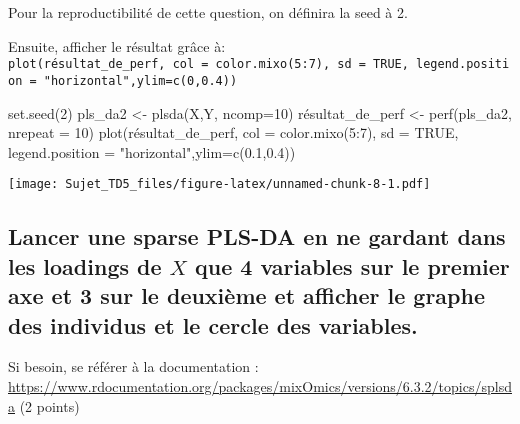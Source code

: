 \documentclass[
]{article}
\newenvironment{Shaded}{\begin{snugshade}}{\end{snugshade}}
\newcommand{\AttributeTok}[1]{\textcolor[rgb]{0.77,0.63,0.00}{#1}}
\newcommand{\ConstantTok}[1]{\textcolor[rgb]{0.00,0.00,0.00}{#1}}
\newcommand{\DecValTok}[1]{\textcolor[rgb]{0.00,0.00,0.81}{#1}}
\newcommand{\FloatTok}[1]{\textcolor[rgb]{0.00,0.00,0.81}{#1}}
\newcommand{\FunctionTok}[1]{\textcolor[rgb]{0.00,0.00,0.00}{#1}}
\newcommand{\NormalTok}[1]{#1}
\newcommand{\OtherTok}[1]{\textcolor[rgb]{0.56,0.35,0.01}{#1}}
\newcommand{\SpecialCharTok}[1]{\textcolor[rgb]{0.00,0.00,0.00}{#1}}
\newcommand{\StringTok}[1]{\textcolor[rgb]{0.31,0.60,0.02}{#1}}
\begin{document}
Pour la reproductibilité de cette question, on définira la seed à 2.

Ensuite, afficher le résultat grâce à:
\texttt{plot(résultat\_de\_perf,\ col\ =\ color.mixo(5:7),\ sd\ =\ TRUE,\ legend.position\ =\ "horizontal",ylim=c(0,0.4))}

\begin{Shaded}
\begin{Highlighting}[]
\FunctionTok{set.seed}\NormalTok{(}\DecValTok{2}\NormalTok{) }
\NormalTok{pls\_da2 }\OtherTok{\textless{}{-}} \FunctionTok{plsda}\NormalTok{(X,Y, }\AttributeTok{ncomp=}\DecValTok{10}\NormalTok{)}
\NormalTok{résultat\_de\_perf }\OtherTok{\textless{}{-}}  \FunctionTok{perf}\NormalTok{(pls\_da2, }\AttributeTok{nrepeat =} \DecValTok{10}\NormalTok{)}
\FunctionTok{plot}\NormalTok{(résultat\_de\_perf, }\AttributeTok{col =} \FunctionTok{color.mixo}\NormalTok{(}\DecValTok{5}\SpecialCharTok{:}\DecValTok{7}\NormalTok{), }\AttributeTok{sd =} \ConstantTok{TRUE}\NormalTok{, }
     \AttributeTok{legend.position =} \StringTok{"horizontal"}\NormalTok{,}\AttributeTok{ylim=}\FunctionTok{c}\NormalTok{(}\FloatTok{0.1}\NormalTok{,}\FloatTok{0.4}\NormalTok{))}
\end{Highlighting}
\end{Shaded}

\texttt{[image: Sujet\_TD5\_files/figure-latex/unnamed-chunk-8-1.pdf]}

\hypertarget{lancer-une-sparse-pls-da-en-ne-gardant-dans-les-loadings-de-x-que-4-variables-sur-le-premier-axe-et-3-sur-le-deuxiuxe8me-et-afficher-le-graphe-des-individus-et-le-cercle-des-variables.}{%
\subsection{\texorpdfstring{Lancer une sparse PLS-DA en ne gardant dans
les loadings de \(X\) que 4 variables sur le premier axe et 3 sur le
deuxième et afficher le graphe des individus et le cercle des
variables.}{Lancer une sparse PLS-DA en ne gardant dans les loadings de X que 4 variables sur le premier axe et 3 sur le deuxième et afficher le graphe des individus et le cercle des variables.}}\label{lancer-une-sparse-pls-da-en-ne-gardant-dans-les-loadings-de-x-que-4-variables-sur-le-premier-axe-et-3-sur-le-deuxiuxe8me-et-afficher-le-graphe-des-individus-et-le-cercle-des-variables.}}

Si besoin, se référer à la documentation :
\url{https://www.rdocumentation.org/packages/mixOmics/versions/6.3.2/topics/splsda}
(2 points)
\end{document}
